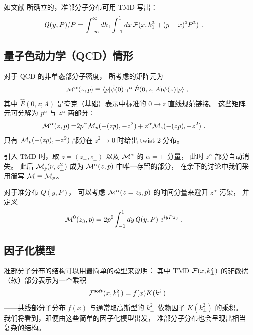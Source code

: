如文献 \cite{Radyushkin:2016hsy} 所确立的，准部分子分布可用 TMD 写出：
 \begin{align}
 Q(y, P) /P =  & \,\int_{-\infty}^{\infty} d  k_1
\int_{-1} ^ {1} d  x \,   {\cal F} (x, k_1^2+(y-x)^2P^2 )
  \  .
 \label{QTMD}
 \end{align}

\subsection{量子色动力学（QCD）情形}

对于 QCD 的非单态部分子密度，
所考虑的矩阵元为
    \begin{align}
 {\cal M}^\alpha  (z,p) \equiv \langle  p |  \bar \psi (0) \,
 \gamma^\alpha \,  { \hat E} (0,z; A) \psi (z) | p \rangle \  ,
\label{Malpha}
\end{align}
其中 $ { \hat E}(0,z; A)$ 是夸克（基础）表示中标准的 $0\to z$ 直线规范链接。
这些矩阵元可分解为 $p^\alpha$ 与 $z^\alpha$ 两部分：
\begin{align}
{\cal M}^\alpha  (z,p) = &2 p^\alpha  {\cal M}_p (-(zp), -z^2)
 + z^\alpha  {\cal M}_z (-(zp),-z^2)
\ .
\end{align}
只有 ${\cal M}_p (-(zp), -z^2) $ 部分在 $z^2 \to 0$ 时给出 twist-2 分布。

引入 TMD 时，取 $z=(z_-, z_\perp)$ 以及 ${\cal M}^\alpha$ 的 \mbox{$\alpha=+$} 分量，
此时 $z^\alpha$ 部分自动消失。
此后 $ {\cal M}_p(\nu, z_\perp^2)$ 成为 ${\cal M}^\alpha  (z,p)$ 中唯一存留的部分，
在余下的讨论中我们采用简写 ${\cal M} \equiv {\cal M}_p$。

对于准分布 $Q(y,P)$，
可以考虑 \mbox{$ {\cal M}^\alpha  (z=z_3,p)$} 的时间分量来避开 $z^\alpha$ 污染，
并定义
 \begin{align}
&  {\cal M}^0   (z_3,p)
  =  2p^0
 \int_{-1}^1 dy\,
Q(y,P) \,
 \,  e^{i  y Pz_3 }  \  .
 \label{OPhixspin12}
\end{align}



\subsection{因子化模型}

准部分子分布的结构可以用最简单的模型来说明：
其中 TMD ${\cal F}  (x, k_\perp^2)$ 的非微扰（软）部分表示为一个乘积
    \begin{align}
{\cal F}^{\rm soft}  (x, k_\perp^2) = f(x) K(k_\perp^2)
\end{align}
——共线部分子分布 $f(x)$ 与通常取高斯型的 \mbox{$k_\perp^2$ 依赖}因子
$K(k_\perp^2)$ 的乘积。
我们将看到，即便由这些简单的因子化模型出发，
准部分子分布也会呈现出相当复杂的结构。

